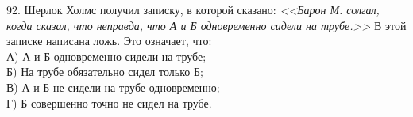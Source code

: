 92. Шерлок Холмс получил записку, в которой сказано: {\it <<Барон М. солгал, когда сказал, что неправда, что А и Б одновременно сидели на трубе.>>} В этой записке написана ложь. Это означает, что:\\
А) А и Б одновременно сидели на трубе;\\
Б) На трубе обязательно сидел только Б;\\
В) А и Б не сидели на трубе одновременно;\\
Г) Б совершенно точно не сидел на трубе.\\
